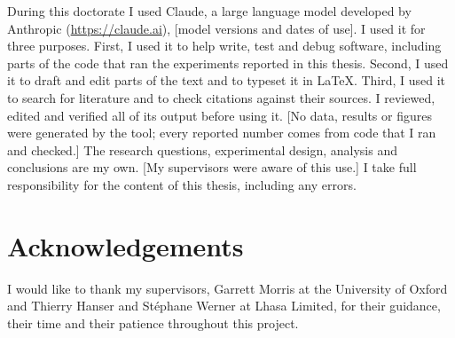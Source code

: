 \documentclass[a4paper,12pt]{report}
\begin{document}
During this doctorate I used Claude, a large language model developed by Anthropic
(\url{https://claude.ai}), [model versions and dates of use]. I used it for three purposes.
First, I used it to help write, test and debug software, including parts of the code that ran
the experiments reported in this thesis. Second, I used it to draft and edit parts of the text
and to typeset it in \LaTeX{}. Third, I used it to search for literature and to check citations
against their sources. I reviewed, edited and verified all of its output before using it.
[No data, results or figures were generated by the tool; every reported number comes from code
that I ran and checked.] The research questions, experimental design, analysis and conclusions
are my own. [My supervisors were aware of this use.] I take full responsibility for the content
of this thesis, including any errors.

\chapter*{Acknowledgements}





I would like to thank my supervisors, Garrett Morris at the University of Oxford and Thierry Hanser
and St\'{e}phane Werner at Lhasa Limited, for their guidance, their time and their patience
throughout this project.
\end{document}
